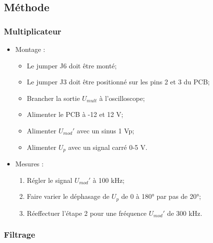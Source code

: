 \subsection{Méthode}

\subsubsection{Multiplicateur}
\begin{itemize}
    \item Montage :
    \begin{itemize}
        \item Le jumper J6 doit être monté;
        \item Le jumper J3 doit être positionné sur les pins 2 et 3 du PCB;
        \item Brancher la sortie $U_{mult}$ à l'oscilloscope;
        \item Alimenter le PCB à -12 et 12 V;
        \item Alimenter $U_{mod}'$ avec un sinus 1 Vp;
        \item Alimenter $U_{p}$ avec un signal carré 0-5 V.
    \end{itemize}


    \item Mesures :
    \begin{enumerate}
        \item Régler le signal $U_{mod}'$ à 100 kHz;
        \item Faire varier le déphasage de $U_{p}$ de 0 à 180° par pas de 20°;
        \item Réeffectuer l'étape 2 pour une fréquence  $U_{mod}'$ de 300 kHz.
    \end{enumerate}

\end{itemize}

\subsubsection{Filtrage}

